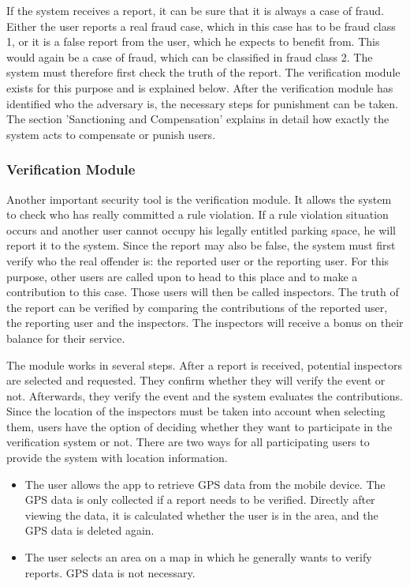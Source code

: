 \documentclass[
a4paper,     %
titlepage,   %
14pt         %
]{scrartcl}  %
\theoremstyle{mystyle}
\begin{document}
If the system receives a report, it can be sure that it is always a case of fraud. Either the user reports a real fraud case, which in this case has to be fraud class 1, or it is a false report from the user, which he expects to benefit from. This would again be a case of fraud, which can be classified in fraud class 2. The system must therefore first check the truth of the report. The verification module exists for this purpose and is explained below. After the verification module has identified who the adversary is, the necessary steps for punishment can be taken. The section 'Sanctioning and Compensation' explains in detail how exactly the system acts to compensate or punish users.

\subsubsection{Verification Module} Another important security tool is the verification module. It allows the system to check who has really committed a rule violation. If a rule violation situation occurs and another user cannot occupy his legally entitled parking space, he will report it to the system. Since the report may also be false, the system must first verify who the real offender is: the reported user or the reporting user. For this purpose, other users are called upon to head to this place and to make a contribution to this case. Those users will then be called inspectors. The truth of the report can be verified by comparing the contributions of the reported user, the reporting user and the inspectors. The inspectors will receive a bonus on their balance for their service.

The module works in several steps. After a report is received, potential inspectors are selected and requested. They confirm whether they will verify the event or not. Afterwards, they verify the event and the system evaluates the contributions. \\

Since the location of the inspectors must be taken into account when selecting them, users have the option of deciding whether they want to participate in the verification system or not. There are two ways for all participating users to provide the system with location information. 
\begin{itemize}
\item The user allows the app to retrieve GPS data from the mobile device. The GPS data is only collected if a report needs to be verified. Directly after viewing the data, it is calculated whether the user is in the area, and the GPS data is deleted again.
\item The user selects an area on a map in which he generally wants to verify reports. GPS data is not necessary.
\end{itemize}
\end{document}
